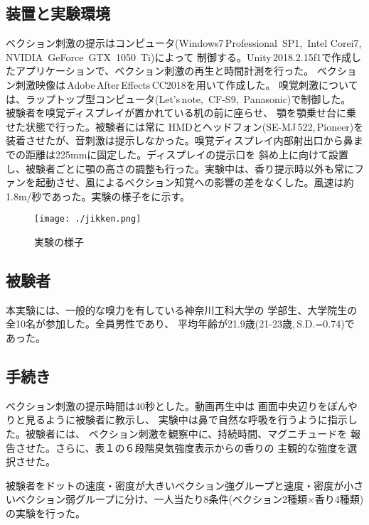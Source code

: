 \documentclass[uplatex]{jsarticle}   %
\begin{document}
\subsection{装置と実験環境}
ベクション刺激の提示はコンピュータ(Windows7\,Professional\, SP1,\, Intel Corei7,\, NVIDIA\, GeForce\, GTX\, 1050\, Ti)によって
制御する。Unity\,2018.2.15f1で作成したアプリケーションで、ベクション刺激の再生と時間計測を行った。
ベクション刺激映像は\,Adobe\,After\,Effects\,CC2018を用いて作成した。
嗅覚刺激については、ラップトップ型コンピュータ(Let's\,note,\, CF-S9,\,
Panasonic)で制御した。\\
被験者を嗅覚ディスプレイが置かれている机の前に座らせ、
顎を顎乗せ台に乗せた状態で行った。被験者には常に
HMDとヘッドフォン(SE-MJ\,522,\,Pioneer)を装着させたが、音刺激は提示しなかった。嗅覚ディスプレイ内部射出口から鼻までの距離は225mmに固定した。ディスプレイの提示口を
斜め上に向けて設置し、被験者ごとに顎の高さの調整も行った。実験中は、香り提示時以外も常にファンを起動させ、風によるベクション知覚への影響の差をなくした。風速は約1.8m/秒であった。実験の様子をに示す。

\begin{figure}[htbp]
 \centering
 \texttt{[image: ./jikken.png]}
 \caption{実験の様子}\label{fig:jikken}
\end{figure}

\subsection{被験者}
本実験には、一般的な嗅力を有している神奈川工科大学の
学部生、大学院生の全10名が参加した。全員男性であり、
平均年齢が21.9歳(21-23歳,\,S.D.=0.74)であった。

\subsection{手続き}
ベクション刺激の提示時間は40秒とした。動画再生中は
画面中央辺りをぼんやりと見るように被験者に教示し、
実験中は鼻で自然な呼吸を行うように指示した。被験者には、
ベクション刺激を観察中に、持続時間、マグニチュードを
報告させた。さらに、表１の６段階臭気強度表示からの香りの
主観的な強度を選択させた。

被験者をドットの速度・密度が大きいベクション強グループと速度・密度が小さいベクション弱グループに分け、一人当たり8条件(ベクション2種類×香り4種類)の実験を行った。
\end{document}
